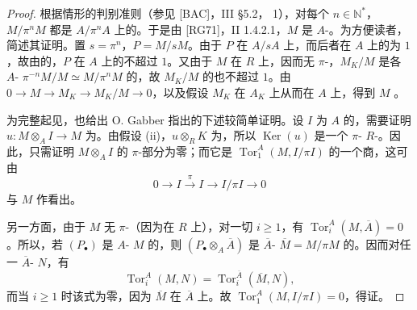 \begin{proof}
根据情形的判别准则（参见 [BAC]，III §5.2， 1），对每个 $n\in\mathbb N^*$，$M/\pi^nM$ 都是 $A/\pi^nA$ 上的。于是由 [RG71]，II  1.4.2.1，$M$ 是 $A$-。为方便读者，简述其证明。置 $s=\pi^n$，$P=M/sM$。由于 $P$ 在 $A/sA$ 上，而后者在 $A$ 上的为 $1$，故由的，$P$ 在 $A$ 上的不超过 $1$。又由于 $M$ 在 $R$ 上，因而无 $\pi$-，$M_K/M$ 是各 $A$- $\pi^{-n}M/M\simeq M/\pi^nM$ 的，故 $M_K/M$ 的也不超过 $1$。由 $0\to M\to M_K\to M_K/M\to0$，以及假设 $M_K$ 在 $A_K$ 上从而在 $A$ 上，得到 $M$ 。

为完整起见，也给出 O. Gabber 指出的下述较简单证明。设 $I$ 为 $A$ 的，需要证明 $u:M\otimes_A I\to M$ 为。由假设 (ii)，$u\otimes_RK$ 为，所以 $\operatorname{Ker}(u)$ 是一个 $\pi$- $R$-。因此，只需证明 $M\otimes_A I$ 的 $\pi$-部分为零；而它是 $\operatorname{Tor}_1^A(M,I/\pi I)$ 的一个商，这可由
\[
0\longrightarrow I\xrightarrow{\pi}I\longrightarrow I/\pi I\longrightarrow0
\]
与 $M$ 作看出。

另一方面，由于 $M$ 无 $\pi$-（因为在 $R$ 上），对一切 $i\geq1$，有 $\operatorname{Tor}_i^A(M,\overline A)=0$。所以，若 $(P_\bullet)$ 是 $A$- $M$ 的，则 $(P_\bullet\otimes_A\overline A)$ 是 $\overline A$- $\overline M=M/\pi M$ 的。因而对任一 $\overline A$- $N$，有
\[
\operatorname{Tor}_i^A(M,N)=\operatorname{Tor}_i^{\overline A}(\overline M,N),
\]
而当 $i\geq1$ 时该式为零，因为 $\overline M$ 在 $\overline A$ 上。故 $\operatorname{Tor}_1^A(M,I/\pi I)=0$，得证。
\end{proof}


